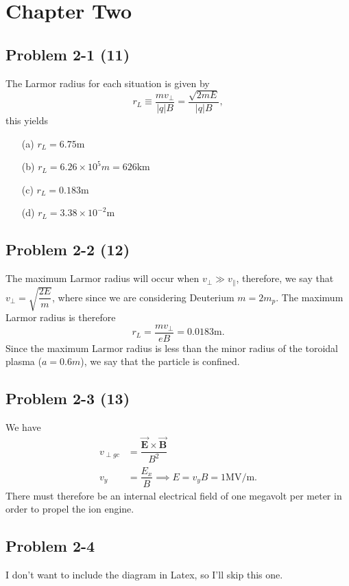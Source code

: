 \chapter*{Chapter Two}
\label{ch:Two}

\section*{Problem 2-1 (11)}
\label{sec:2-1}
The Larmor radius for each situation is given by 
\begin{equation}
	r_L \equiv \dfrac{mv_\perp}{|q|B} = \dfrac{\sqrt{2mE}}{|q|B},
\end{equation}
this yields
\begin{itemize}
	\item[(a)] \(r_L = 6.75\text{m} \)
	\item[(b)] \(r_L = 6.26\times10^{5}m = 626\text{km}\)
	\item[(c)] \(r_L = 0.183\text{m} \)
	\item[(d)] \(r_L = 3.38\times10^{-2}\text{m} \)
\end{itemize}

\section*{Problem 2-2 (12)}
\label{sec:2-2}
The maximum Larmor radius will occur when \(v_\perp \gg v_\parallel \), therefore, we say that \(v_\perp = \sqrt{\dfrac{2E}{m}} \), where since we are considering Deuterium \(m = 2m_p\). The maximum Larmor radius is therefore
\begin{equation}
	r_L = \dfrac{mv_\perp}{eB} = 0.0183\text{m}.
\end{equation} 
Since the maximum Larmor radius is less than the minor radius of the toroidal plasma (\(a = 0.6m\)), we say that the particle is confined.

\section*{Problem 2-3 (13)}
\label{sec:2-3}
We have
\begin{align}
	v_{\perp gc} &= \dfrac{\vec{\textbf{E}}\times\vec{\textbf{B}}}{B^2} \\ 
	v_y &= \dfrac{E_x}{B} \implies
	E = v_yB = 1\text{MV/m}.
\end{align}
There must therefore be an internal electrical field of one megavolt per meter in order to propel the ion engine. 

\section*{Problem 2-4}
\label{sec:2-4}
I don't want to include the diagram in Latex, so I'll skip this one. 

